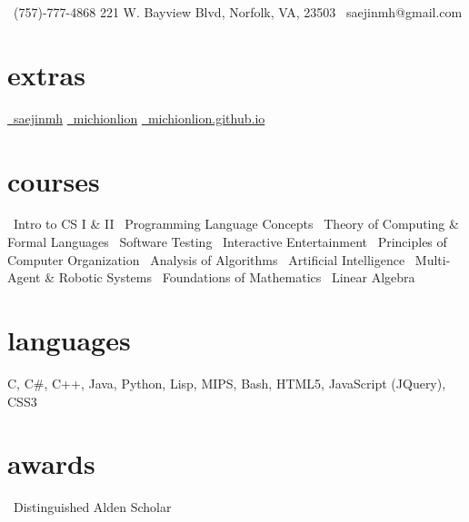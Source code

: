 \documentclass[]{friggeri-cv}
\begin{document}
       {\faMobilePhone\ (757)-777-4868 \hspace{1cm} 221 W. Bayview Blvd, Norfolk, VA, 23503 \hspace{1cm} \faEnvelope\ saejinmh@gmail.com}

\begin{aside}
  \section{extras}
    \href{https://www.linkedin.com/in/saejinmh}{\faLinkedin\ saejinmh}\vspace{0.03cm}
    \href{https://github.com/Michionlion}{\faGithub\ michionlion}\vspace{0.03cm}
    \href{https://michionlion.github.io}{\faGlobe\ michionlion.github.io}\vspace{0.03cm}
  \section{courses}
	\bullet\ Intro to CS I \& II\vspace{0.1cm}
	\bullet\ Programming Language Concepts\vspace{0.1cm}
	\bullet\ Theory of Computing \& Formal Languages\vspace{0.1cm}	
	\bullet\ Software Testing\vspace{0.1cm}
	\bullet\ Interactive Entertainment\vspace{0.1cm}
	\bullet\ Principles of Computer Organization\vspace{0.1cm}
    \bullet\ Analysis of Algorithms\vspace{0.1cm}
    \bullet\ Artificial Intelligence\vspace{0.1cm}
    \bullet\ Multi-Agent \& Robotic Systems\vspace{0.1cm}
    \bullet\ Foundations of Mathematics\vspace{0.1cm}
    \bullet\ Linear Algebra\vspace{0.1cm}
  \section{languages}
    C, C\#, C++, Java, Python, Lisp, MIPS, Bash, HTML5, JavaScript (JQuery), CSS3\vspace{0.1cm}
  \section{awards}
    \bullet\ Distinguished Alden Scholar\vspace{0.1cm}
\end{aside}
\end{document}
